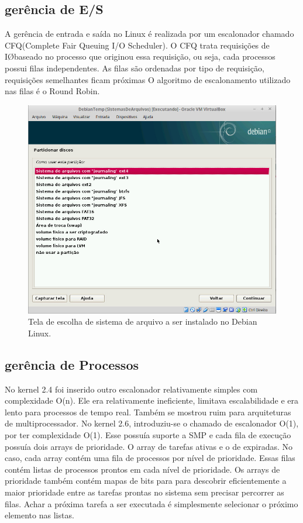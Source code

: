 \documentclass[conference]{IEEEtran}
\begin{document}
\subsection{gerência de E/S}\label{sec:LinuxES}
A gerência de entrada e saída no Linux é realizada por um escalonador chamado CFQ(Complete Fair Queuing I/O Scheduler). O CFQ trata requisições de I\O baseado no processo que originou essa requisição, ou seja, cada processos possui filas independentes. As filas são ordenadas por tipo de requisição, requisições semelhantes ficam próximas O algoritmo de escalonamento utilizado nas filas é o Round Robin\cite{GerenciaIOLinux}.
\begin{figure}[h!]
	\centering
	\includegraphics[scale=0.3]{SistemasArquivosLinux.jpeg}
	\caption{Tela de escolha de sistema de arquivo a ser instalado no Debian Linux.}
	\label{fig:SisAqrLinux}
\end{figure}
\subsection{gerência de Processos}\label{sec:LinuxPROC}
No kernel 2.4 foi  inserido outro escalonador relativamente simples com complexidade O(n). Ele era relativamente ineficiente, limitava escalabilidade e era lento para processos de tempo real. Também se mostrou ruim para arquiteturas de multiprocessador. No kernel 2.6, introduziu-se o chamado de escalonador O(1), por ter complexidade O(1). Esse possuía suporte a SMP e cada fila de execução possuía dois arrays de prioridade.
O array de tarefas ativas e o de expiradas. No caso, cada array contém uma fila de processos por nível de prioridade. Essas filas contém listas de processos prontos em cada nível de prioridade. Os  arrays de prioridade também contém mapas de bits para para descobrir eficientemente a maior prioridade entre as tarefas prontas no sistema sem precisar percorrer as filas. Achar a próxima tarefa a ser executada é simplesmente selecionar o próximo elemento nas listas.\\
\end{document}
